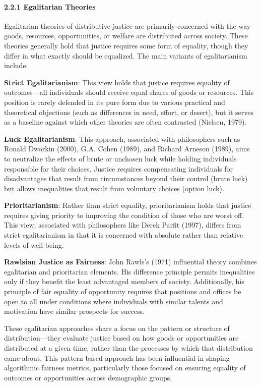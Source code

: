 \paragraph{2.2.1 Egalitarian Theories}\label{egalitarian-theories}

Egalitarian theories of distributive justice are primarily concerned
with the way goods, resources, opportunities, or welfare are distributed
across society. These theories generally hold that justice requires some
form of equality, though they differ in what exactly should be
equalized. The main variants of egalitarianism include:

\textbf{Strict Egalitarianism}: This view holds that justice requires
equality of outcomes---all individuals should receive equal shares of
goods or resources. This position is rarely defended in its pure form
due to various practical and theoretical objections (such as differences
in need, effort, or desert), but it serves as a baseline against which
other theories are often contrasted (Nielsen, 1979).

\textbf{Luck Egalitarianism}: This approach, associated with
philosophers such as Ronald Dworkin (2000), G.A. Cohen (1989), and
Richard Arneson (1989), aims to neutralize the effects of brute or
unchosen luck while holding individuals responsible for their choices.
Justice requires compensating individuals for disadvantages that result
from circumstances beyond their control (brute luck) but allows
inequalities that result from voluntary choices (option luck).

\textbf{Prioritarianism}: Rather than strict equality, prioritarianism
holds that justice requires giving priority to improving the condition
of those who are worst off. This view, associated with philosophers like
Derek Parfit (1997), differs from strict egalitarianism in that it is
concerned with absolute rather than relative levels of well-being.

\textbf{Rawlsian Justice as Fairness}: John Rawls's (1971) influential
theory combines egalitarian and prioritarian elements. His difference
principle permits inequalities only if they benefit the least advantaged
members of society. Additionally, his principle of fair equality of
opportunity requires that positions and offices be open to all under
conditions where individuals with similar talents and motivation have
similar prospects for success.

These egalitarian approaches share a focus on the pattern or structure
of distribution---they evaluate justice based on how goods or
opportunities are distributed at a given time, rather than the processes
by which that distribution came about. This pattern-based approach has
been influential in shaping algorithmic fairness metrics, particularly
those focused on ensuring equality of outcomes or opportunities across
demographic groups.

